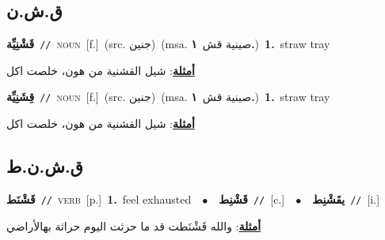 \documentclass[10pt,a4paper,twoside]{article} %
\begin{document}
\begin{multicols}{2}
\vspace{-3mm}
\subsection*{\color{blue}\foreignlanguage{arabic}{ق.ش.ن}\color{blue}{}} 

{\setlength\topsep{0pt}\textbf{\foreignlanguage{arabic}{قَشْنِيِّة}}\ {\color{gray}\texttt{//}\color{black}}\ \textsc{noun}\ [f.]\ (src. \color{gray}\foreignlanguage{arabic}{جنين}\color{black})\ \color{gray}(msa. \foreignlanguage{arabic}{صينية قش}~\foreignlanguage{arabic}{\textbf{١.}})\color{black}\ \textbf{1.}~straw tray\  \begin{flushright}\color{gray}\foreignlanguage{arabic}{\textbf{\underline{\foreignlanguage{arabic}{أمثلة}}}: شيل القشنية من هون، خلصت اكل}\end{flushright}\color{black}} \vspace{2mm}

{\setlength\topsep{0pt}\textbf{\foreignlanguage{arabic}{قِشَنِيِّة}}\ {\color{gray}\texttt{//}\color{black}}\ \textsc{noun}\ [f.]\ (src. \color{gray}\foreignlanguage{arabic}{جنين}\color{black})\ \color{gray}(msa. \foreignlanguage{arabic}{صينية قش}~\foreignlanguage{arabic}{\textbf{١.}})\color{black}\ \textbf{1.}~straw tray\  \begin{flushright}\color{gray}\foreignlanguage{arabic}{\textbf{\underline{\foreignlanguage{arabic}{أمثلة}}}: شيل القشنية من هون، خلصت اكل}\end{flushright}\color{black}} \vspace{2mm}

\vspace{-3mm}
\subsection*{\color{blue}\foreignlanguage{arabic}{ق.ش.ن.ط}\color{blue}{}} 

{\setlength\topsep{0pt}\textbf{\foreignlanguage{arabic}{قَشْنَط}}\ {\color{gray}\texttt{//}\color{black}}\ \textsc{verb}\ [p.]\ \textbf{1.}~feel exhausted\ \ $\bullet$\ \ \setlength\topsep{0pt}\textbf{\foreignlanguage{arabic}{قَشْنِط}}\ {\color{gray}\texttt{//}\color{black}}\ [c.]\ \ $\bullet$\ \ \setlength\topsep{0pt}\textbf{\foreignlanguage{arabic}{يقَشْنِط}}\ {\color{gray}\texttt{//}\color{black}}\ [i.]\  \begin{flushright}\color{gray}\foreignlanguage{arabic}{\textbf{\underline{\foreignlanguage{arabic}{أمثلة}}}: والله قَشْنَطت قد ما حرثت اليوم حراثة بهالأراضي}\end{flushright}\color{black}} \vspace{2mm}


\end{multicols}
\end{document}
